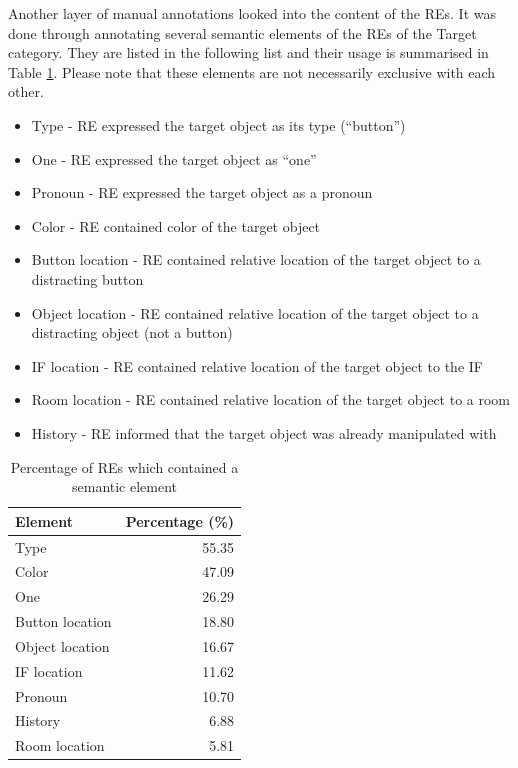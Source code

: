 Another layer of manual annotations looked into the content of the REs. It was done through annotating several semantic elements of the REs of the Target category. They are listed in the following list and their usage is summarised in Table \ref{tab:res-contents}. Please note that these elements are not necessarily exclusive with each other.

\begin{itemize}
\item
Type - RE expressed the target object as its type (``button'')
\item
One - RE expressed the target object as ``one''
\item
Pronoun - RE expressed the target object as a pronoun
\item
Color -  RE contained color of the target object
\item
Button location - RE contained relative location of the target object to a distracting button
\item
Object location - RE contained relative location of the target object to a distracting object (not a button)
\item 
IF location - RE contained relative location of the target object to the IF
\item
Room location - RE contained relative location of the target object to a room
\item
History - RE informed that the target object was already manipulated with
\end{itemize}

\begin{table}[!htbp]
 \centering
\begin{tabular}{lr}
\toprule
Element  & Percentage (\%)  \\
\midrule
Type   			& 55.35\\
Color			& 47.09\\
One 				& 26.29\\
Button location & 18.80\\
Object location 	& 16.67\\
IF location		& 11.62\\
Pronoun			& 10.70\\
History			& 6.88\\
Room location 	& 5.81\\
\bottomrule
\end{tabular}
\caption{Percentage of REs which contained a semantic element}
\label{tab:res-contents}
\end{table} 

